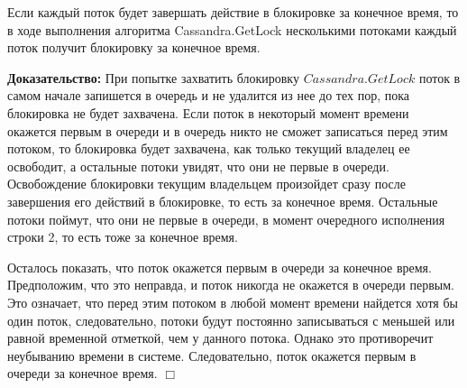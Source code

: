 \begin{theorem}
Если каждый поток будет завершать действие в блокировке за конечное время, то в ходе выполнения алгоритма Cassandra.GetLock несколькими потоками каждый поток получит блокировку за конечное время.
\end{theorem}
\textbf{Доказательство:}
При попытке захватить блокировку $Cassandra.GetLock$ поток в самом начале запишется в очередь и не удалится из нее до тех пор, пока блокировка не будет захвачена. Если поток в некоторый момент времени окажется первым в очереди и в очередь никто не сможет записаться перед этим потоком, то блокировка будет захвачена, как только текущий владелец ее освободит, а остальные потоки увидят, что они не первые в очереди. Освобождение блокировки текущим владельцем произойдет сразу после завершения его действий в блокировке, то есть за конечное время. Остальные потоки поймут, что они не первые в очереди, в момент очередного исполнения строки 2, то есть тоже за конечное время.

Осталось показать, что поток окажется первым в очереди за конечное время.
Предположим, что это неправда, и поток никогда не окажется в очереди первым. Это означает, что перед этим потоком в любой момент времени найдется хотя бы один поток, следовательно, потоки будут постоянно записываться с меньшей или равной временной отметкой, чем у данного потока. Однако это противоречит неубыванию времени в системе. Следовательно, поток окажется первым в очереди за конечное время.
$\Box$
